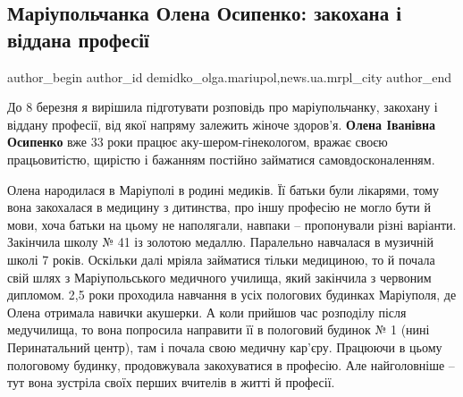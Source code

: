  
 
 
 
 
 
\subsection{Маріупольчанка Олена Осипенко: закохана і віддана професії}
\label{sec:08_03_2019.stz.news.ua.mrpl_city.2.olena_osypenko}
 
\ifcmt
 author_begin
   author_id demidko_olga.mariupol,news.ua.mrpl_city
 author_end
\fi

До 8 березня я вирішила підготувати розповідь про маріупольчанку, закохану і
віддану професії, від якої напряму залежить жіноче здоров'я. \textbf{Олена Іванівна
Осипенко} вже 33 роки працює аку\hyp{}шером-гінекологом, вражає своєю працьовитістю,
щирістю і бажанням постійно займатися самовдосконаленням.


Олена народилася в Маріуполі в родині медиків. Її батьки були лікарями, тому
вона закохалася в медицину з дитинства, про іншу професію не могло бути й мови,
хоча батьки на цьому не наполягали, навпаки – пропонували різні варіанти.
Закінчила школу № 41 із золотою медаллю. Паралельно навчалася в музичній школі
7 років. Оскільки далі мріяла займатися тільки медициною, то й почала свій шлях
з Маріупольського медичного училища, який закінчила з червоним дипломом. 2,5
роки проходила навчання в усіх пологових будинках Маріуполя, де Олена отримала
навички акушерки. А коли прийшов час розподілу після медучилища, то вона
попросила направити її в пологовий будинок № 1 (нині Перинатальний центр), там
і почала свою медичну кар'єру. Працюючи в цьому пологовому будинку,
продовжувала закохуватися в професію. Але найголовніше – тут вона зустріла
своїх перших вчителів в житті й професії.

\medskip
\medskip

